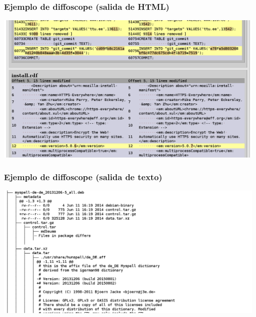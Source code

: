 \documentclass[14pt,aspectratio=169]{beamer}
\begin{document}
\begin{frame}
 \frametitle{Ejemplo de diffoscope (salida de HTML)}

 \begin{center}
  \includegraphics[width=0.9\paperwidth]{images/diffoscope_example_html.png}
 \end{center}
\end{frame}

\begin{frame}
 \frametitle{Ejemplo de diffoscope (salida de texto)}

 \begin{center}
  \includegraphics[width=0.9\paperwidth]{images/diffoscope_example_text.png}
 \end{center}
\end{frame}
\end{document}
